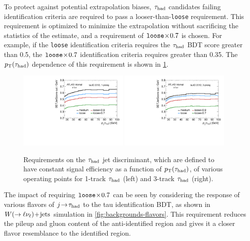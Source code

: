 To protect against potential extrapolation biases, $\tau_\text{had}$ candidates failing identification criteria are required to pass a looser-than-\texttt{loose} requirement. This requirement is optimized to minimize the extrapolation without sacrificing the statistics of the estimate, and a requirement of $\texttt{loose}\!\times\!0.7$ is chosen. For example, if the \texttt{loose} identification criteria requires the $\tau_\text{had}$ BDT score greater than 0.5, the $\texttt{loose}\!\times\!0.7$ identification criteria requires greater than 0.35. The $p_{\mathrm{T}}(\tau_\text{had})$ dependence of this requirement is shown in \cref{fig:backgrounds-workingpoints}.

\begin{figure}[tp]
  \centering
  \includegraphics[width=0.48\textwidth]{figures/backgrounds/jetBDT-1p}
  \includegraphics[width=0.48\textwidth]{figures/backgrounds/jetBDT-3p}
  \caption{Requirements on the $\tau_\text{had}$ jet discriminant, which are defined to have constant signal efficiency as a function of $p_{\mathrm{T}}(\tau_\text{had})$, of various operating points for 1-track $\tau_\text{had}$ (left) and 3-track $\tau_\text{had}$ (right).}
  \label{fig:backgrounds-workingpoints}
\end{figure}

The impact of requiring $\texttt{loose}\!\times\!0.7$ can be seen by considering the response of various flavors of $j\!\rightarrow\!\tau_\text{had}$ to the tau identification BDT, as shown in $W (\rightarrow \ell\nu_\ell)\!+\!\text{jets}$ simulation in \cref{fig:backgrounds-flavors}. This requirement reduces the pileup and gluon content of the anti-identified region and gives it a closer flavor resemblance to the identified region.

